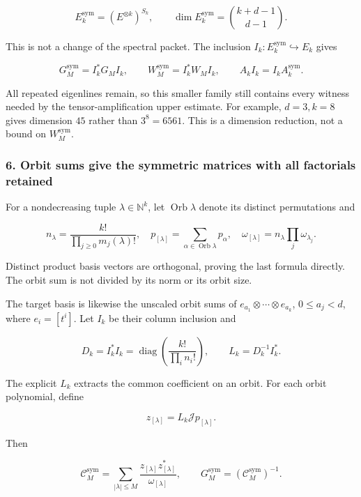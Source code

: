 \[E_k^{\mathrm{sym}}=(E^{\otimes k})^{S_k},\qquad
\boxed{\dim E_k^{\mathrm{sym}}=\binom{k+d-1}{d-1}.}\tag{5.6}\]

This is not a change of the spectral packet. The inclusion
\(I_k:E_k^{\mathrm{sym}}\hookrightarrow E_k\) gives

\[G_M^{\mathrm{sym}}=I_k^*G_MI_k,\qquad
W_M^{\mathrm{sym}}=I_k^*W_MI_k,\qquad A_kI_k=I_kA_k^{\mathrm{sym}}.\tag{5.7}\]

All repeated eigenlines remain, so this smaller family still contains
every witness needed by the tensor-amplification upper estimate. For
example, \(d=3,k=8\) gives dimension \(45\) rather than \(3^8=6561\).
This is a dimension reduction, not a bound on \(W_M^{\mathrm{sym}}\).

\subsubsection{6. Orbit sums give the symmetric matrices with all
factorials
retained}\label{symmetric_frontier:orbit-sums-give-the-symmetric-matrices-with-all-factorials-retained}

For a nondecreasing tuple \(\lambda\in\mathbb N^k\), let
\(\operatorname{Orb}\lambda\) denote its distinct permutations and

\[n_\lambda=\frac{k!}{\prod_{j\ge0}m_j(\lambda)!},\quad
p_{[\lambda]}=\sum_{\alpha\in\operatorname{Orb}\lambda}p_\alpha,\quad
\omega_{[\lambda]}=n_\lambda\prod_j\omega_{\lambda_j}.\tag{6.1}\]

Distinct product basis vectors are orthogonal, proving the last formula
directly. The orbit sum is not divided by its norm or its orbit size.

The target basis is likewise the unscaled orbit sums of
\(e_{a_1}\otimes\cdots\otimes e_{a_k}\), \(0\le a_j<d\), where
\(e_i=[t^i]\). Let \(I_k\) be their column inclusion and

\[D_k=I_k^*I_k=\operatorname{diag}\left(\frac{k!}{\prod_i n_i!}\right),\qquad
L_k=D_k^{-1}I_k^*.\tag{6.2}\]

The explicit \(L_k\) extracts the common coefficient on an orbit. For
each orbit polynomial, define

\[z_{[\lambda]}=L_k\mathcal Jp_{[\lambda]}.\]

Then

\[\boxed{\mathcal C_M^{\mathrm{sym}}
=\sum_{|\lambda|\le M}\frac{z_{[\lambda]}z_{[\lambda]}^*}{\omega_{[\lambda]}},\qquad
G_M^{\mathrm{sym}}=(\mathcal C_M^{\mathrm{sym}})^{-1}.}\tag{6.3}\]

